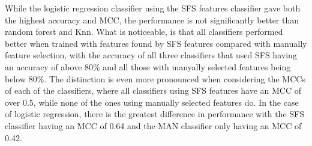While the logistic regression classifier using the SFS features classifier gave both the highest accuracy and MCC, the performance is not significantly better than random forest and Knn. What is noticeable, is that all classifiers performed better when trained with features found by SFS features compared with manually feature selection, with the accuracy of all three classifiers that used SFS having an accuracy of above 80\% and all those with manyally selected features being below 80\%. The distinction is even more pronounced when considering the MCCs of each of the classifiers, where all classifiers using SFS features have an MCC of over 0.5, while none of the ones using manually selected features do. In the case of logistic regression, there is the greatest difference in performance with the SFS classifier having an MCC of 0.64 and the MAN classifier only having an MCC of 0.42. 

%
\childMat

